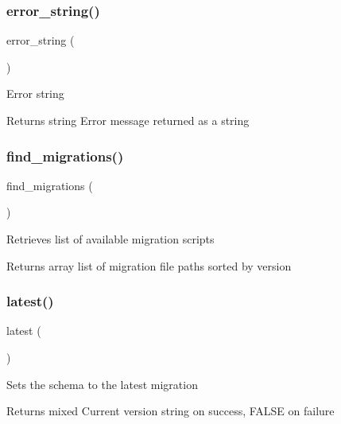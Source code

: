 \subsubsection{\texorpdfstring{error\+\_\+string()}{error\_string()}}
{\footnotesize\ttfamily error\+\_\+string (\begin{DoxyParamCaption}{ }\end{DoxyParamCaption})}

Error string

\begin{DoxyReturn}{Returns}
string Error message returned as a string 
\end{DoxyReturn}
\mbox{\label{class_c_i___migration_a6581e916a05e39e46c09fe9878b2d93a}} 
\subsubsection{\texorpdfstring{find\+\_\+migrations()}{find\_migrations()}}
{\footnotesize\ttfamily find\+\_\+migrations (\begin{DoxyParamCaption}{ }\end{DoxyParamCaption})}

Retrieves list of available migration scripts

\begin{DoxyReturn}{Returns}
array list of migration file paths sorted by version 
\end{DoxyReturn}
\mbox{\label{class_c_i___migration_a23502a9f08bfc74caf3914113d11db2b}} 
\subsubsection{\texorpdfstring{latest()}{latest()}}
{\footnotesize\ttfamily latest (\begin{DoxyParamCaption}{ }\end{DoxyParamCaption})}

Sets the schema to the latest migration

\begin{DoxyReturn}{Returns}
mixed Current version string on success, F\+A\+L\+SE on failure 
\end{DoxyReturn}
\mbox{\label{class_c_i___migration_a9192bce789e541754ba481dfec6bb39a}} 
